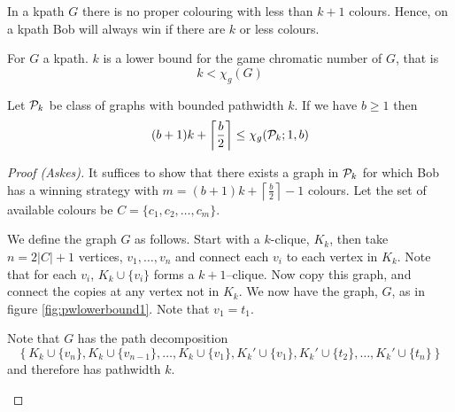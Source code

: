  In a kpath $G$ there is no proper colouring with less than $k+1$ colours. Hence, on a kpath Bob will always win if there are $k$ or less colours. 
 \begin{theorem}
 For $G$ a kpath. $k$ is a lower bound for the game chromatic number of $G$, that is 
    \[k < \chi_g(G) \] 
 \end{theorem}

\begin{theorem}%
    Let $\mathcal{P}_k$ be class of graphs with bounded pathwidth $k$. If we have $b\geq1$  then \[(b+1)k+\left\lceil \frac{b}{2}\right\rceil\leq\chi_g(\mathcal{P}_k;1,b)\]
\end{theorem}

\begin{proof}[Proof (Askes)]
    It suffices to show that there exists a graph in $\mathcal{P}_k$ for which Bob has a winning strategy with $m=(b+1)k+\left\lceil\frac{b}{2}\right\rceil-1$ colours. Let the set of available colours be $C=\{c_1,c_2,\dots,c_m\}$.
    
    We define the graph $G$ as follows. Start with a $k$-clique, $K_k$, then take $n=2|C|+1$ vertices, $v_1,\dots,v_n$ and connect each $v_i$ to each vertex in $K_k$. Note that for each $v_i$, $K_k\cup\{v_i\}$ forms a $k+1$--clique. Now copy this graph, and connect the copies at any vertex not in $K_k$. We now have the graph, $G$, as in figure \ref{fig:pwlowerbound1}. Note that $v_1=t_1$. 
    
    Note that $G$ has the path decomposition \[\left\{K_k\cup\{v_n\}, K_k\cup\{v_{n-1}\}, \dots, K_k\cup\{v_1\}, K_k'\cup\{v_1\}, K_k'\cup\{t_2\}, \dots, K_k'\cup\{t_n\}\right\}\] and therefore has pathwidth $k$.
\begin{figure}[H]
    \centering
{}
\end{figure}
\end{proof}
